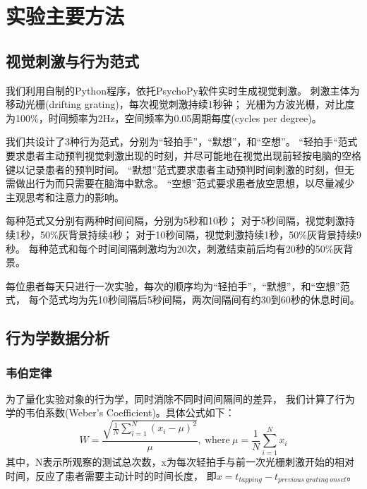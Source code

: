 \section{实验主要方法}

\subsection{视觉刺激与行为范式}

我们利用自制的Python程序，依托PsychoPy软件\cite{psychopy}实时生成视觉刺激。
刺激主体为移动光栅(drifting grating)，每次视觉刺激持续1秒钟；
光栅为方波光栅，对比度为100\%，时间频率为2Hz，空间频率为0.05周期每度(cycles per degree)。

我们共设计了3种行为范式，分别为“轻拍手”，“默想”，和“空想”。%
“轻拍手“范式要求患者主动预判视觉刺激出现的时刻，并尽可能地在视觉出现前轻按电脑的空格键以记录患者的预判时间。
“默想”范式要求患者主动预判时间刺激的时刻，但无需做出行为而只需要在脑海中默念。
“空想”范式要求患者放空思想，以尽量减少主观思考和注意力的影响。

每种范式又分别有两种时间间隔，分别为5秒和10秒；
对于5秒间隔，视觉刺激持续1秒，50\%灰背景持续4秒；
对于10秒间隔，视觉刺激持续1秒，50\%灰背景持续9秒。
每种范式和每个时间间隔刺激均为20次，刺激结束前后均有20秒的50\%灰背景。

每位患者每天只进行一次实验，每次的顺序均为“轻拍手”，“默想”，和“空想”范式，
每个范式均为先10秒间隔后5秒间隔，两次间隔间有约30到60秒的休息时间。

\subsection{行为学数据分析}

\subsubsection{韦伯定律}
为了量化实验对象的行为学，同时消除不同时间间隔间的差异，
我们计算了行为学的韦伯系数(Weber's Coefficient)\cite{gibbon1977scalar, hardy2018encoding}。具体公式如下：
\begin{equation}
    W = \frac{\sqrt{\frac{1}{N} \sum_{i=1}^N (x_i - \mu) ^ 2}}{\mu},\ \mathrm{where}\ \mu = \frac{1}{N} \sum_{i=1}^N x_i
\end{equation}
其中，N表示所观察的测试总次数，x为每次轻拍手与前一次光栅刺激开始的相对时间，反应了患者需要主动计时的时间长度，
即$ x = t_{tapping} - t_{previous\ grating\ onset} $。

